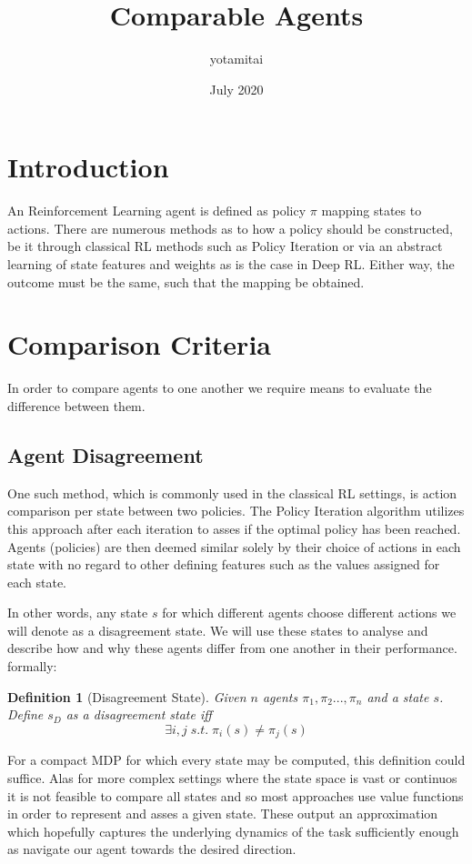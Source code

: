\documentclass{article}
\title{Comparable Agents}
\author{yotamitai }
\date{July 2020}
\newtheorem{definition}{Definition}
\begin{document}
\maketitle

\section{Introduction}
An Reinforcement Learning agent is defined as policy $\pi$ mapping states to actions. There are
numerous methods as to how a policy should be constructed, be it through classical RL methods such
as Policy Iteration or via an abstract learning of state features and weights as is the case in Deep
RL. Either way, the outcome must be the same, such that the mapping be obtained.

\section{Comparison Criteria}
In order to compare agents to one another we require means to evaluate the difference between them.

\subsection{Agent Disagreement}
One such method, which is commonly used in the classical RL settings, is action comparison per state
between two policies. The Policy Iteration algorithm utilizes this approach after each iteration to
asses if the optimal policy has been reached. Agents (policies) are then deemed
similar solely by their choice of actions in each state with no regard to other defining features
such as the values assigned for each state.

In other words, any state $s$ for which different agents choose different actions we will denote as
a disagreement state. We will use these states to analyse and describe how and why these agents
differ from one another in their performance. formally:
\begin{definition}[Disagreement State]
    Given $n$ agents $\pi_1,\pi_2...,\pi_n$ and a state $s$. Define $s_D$ as a disagreement state
    iff  \[\exists i,j \; s.t. \; \pi_i(s) \neq \pi_j(s)\]
\end{definition} 

For a compact MDP for which every state may be computed, this definition could suffice.
Alas for more complex settings where the state space is vast or continuos it is not feasible to
compare all states and so most approaches use value functions in order to represent and asses a
given state. These output an approximation which hopefully captures the underlying dynamics of the
task sufficiently enough as navigate our agent towards the desired direction. 
\end{document}
